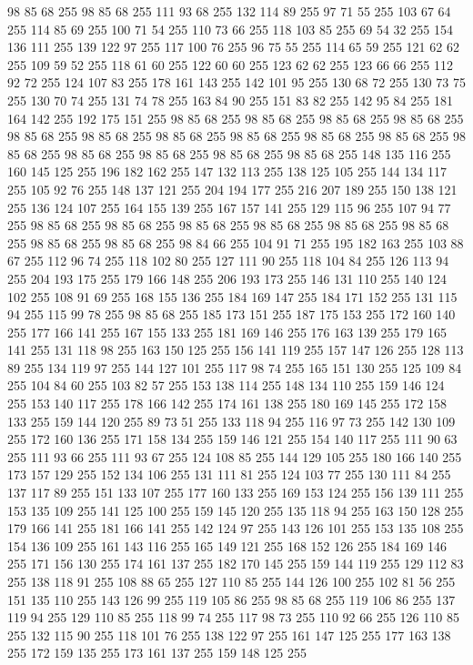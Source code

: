 98 85 68 255 98 85 68 255 111 93 68 255 132 114 89 255 97 71 55 255 103 67 64 255 114 85 69 255 100 71 54 255 110 73 66 255 118 103 85 255 69 54 32 255 154 136 111 255 139 122 97 255 117 100 76 255 96 75 55 255 114 65 59 255 121 62 62 255 109 59 52 255 118 61 60 255 122 60 60 255 123 62 62 255 123 66 66 255 112 92 72 255 124 107 83 255 178 161 143 255 142 101 95 255 130 68 72 255 130 73 75 255 130 70 74 255 131 74 78 255 163 84 90 255 151 83 82 255 142 95 84 255 181 164 142 255 192 175 151 255 98 85 68 255 98 85 68 255 98 85 68 255 98 85 68 255 98 85 68 255 98 85 68 255 98 85 68 255 98 85 68 255 98 85 68 255 98 85 68 255 98 85 68 255 98 85 68 255 98 85 68 255 98 85 68 255 98 85 68 255 148 135 116 255 160 145 125 255 196 182 162 255 147 132 113 255 138 125 105 255 144 134 117 255 105 92 76 255 148 137 121 255 204 194 177 255 216 207 189 255 150 138 121 255 136 124 107 255 164 155 139 255 167 157 141 255
129 115 96 255 107 94 77 255 98 85 68 255 98 85 68 255 98 85 68 255 98 85 68 255 98 85 68 255 98 85 68 255 98 85 68 255 98 85 68 255 98 84 66 255 104 91 71 255 195 182 163 255 103 88 67 255 112 96 74 255 118 102 80 255 127 111 90 255 118 104 84 255 126 113 94 255 204 193 175 255 179 166 148 255 206 193 173 255 146 131 110 255 140 124 102 255 108 91 69 255 168 155 136 255 184 169 147 255 184 171 152 255 131 115 94 255 115 99 78 255 98 85 68 255 185 173 151 255 187 175 153 255 172 160 140 255 177 166 141 255 167 155 133 255 181 169 146 255 176 163 139 255 179 165 141 255 131 118 98 255 163 150 125 255 156 141 119 255 157 147 126 255 128 113 89 255 134 119 97 255 144 127 101 255 117 98 74 255 165 151 130 255 125 109 84 255 104 84 60 255 103 82 57 255 153 138 114 255 148 134 110 255 159 146 124 255 153 140 117 255 178 166 142 255 174 161 138 255 180 169 145 255 172 158 133 255 159 144 120 255 89 73 51 255 133 118 94 255 116 97 73 255 142 130 109 255
172 160 136 255 171 158 134 255 159 146 121 255 154 140 117 255 111 90 63 255 111 93 66 255 111 93 67 255 124 108 85 255 144 129 105 255 180 166 140 255 173 157 129 255 152 134 106 255 131 111 81 255 124 103 77 255 130 111 84 255 137 117 89 255 151 133 107 255 177 160 133 255 169 153 124 255 156 139 111 255 153 135 109 255 141 125 100 255 159 145 120 255 135 118 94 255 163 150 128 255 179 166 141 255 181 166 141 255 142 124 97 255 143 126 101 255 153 135 108 255 154 136 109 255 161 143 116 255 165 149 121 255 168 152 126 255 184 169 146 255 171 156 130 255 174 161 137 255 182 170 145 255 159 144 119 255 129 112 83 255 138 118 91 255 108 88 65 255 127 110 85 255 144 126 100 255 102 81 56 255 151 135 110 255 143 126 99 255 119 105 86 255 98 85 68 255 119 106 86 255 137 119 94 255 129 110 85 255 118 99 74 255 117 98 73 255 110 92 66 255 126 110 85 255 132 115 90 255 118 101 76 255 138 122 97 255 161 147 125 255 177 163 138 255 172 159 135 255 173 161 137 255 159 148 125 255
